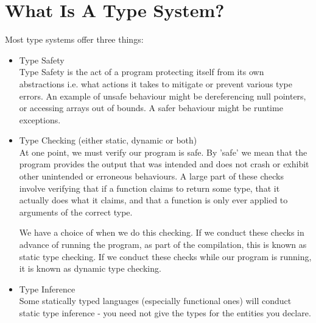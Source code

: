 \chapter{What Is A Type System?}
	Most type systems offer three things:
	\begin{itemize}
		\item Type Safety \\
		Type Safety is the act of a program protecting itself from its own abstractions i.e. what actions it takes to mitigate or prevent various type errors.
		An example of unsafe behaviour might be dereferencing null pointers, or accessing arrays out of bounds. A safer behaviour might be runtime exceptions.
		
		\item Type Checking (either static, dynamic or both) \\
		At one point, we must verify our program is safe. By 'safe' we mean that the program provides the output that was intended and does not crash or exhibit other unintended or erroneous behaviours. A large part of these checks involve verifying that if a function claims to return some type, that it actually does what it claims, and that a function is only ever applied to arguments of the correct type. 
		
		We have a choice of when we do this checking. If we conduct these checks in advance of running the program, as part of the compilation, this is known as static type checking. If we conduct these checks while our program is running, it is known as dynamic type checking.
		
		
		\item Type Inference \\
		Some statically typed languages (especially functional ones) will conduct static type inference - you need not give the types for the entities you declare. 
	\end{itemize}
	
